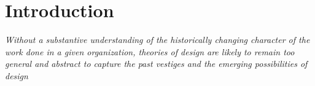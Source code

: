 \documentclass{ICED-Paper}%
\begin{document}

\section{Introduction}

\emph{Without a substantive understanding of the historically changing character of the work done in a given organization, theories of design are likely to remain too general and abstract to capture the past vestiges and the emerging possibilities of design}\cite{ExpansiveDesign}

\bigskip
\end{document}
